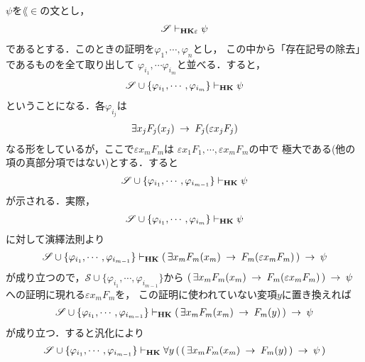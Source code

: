 	\begin{sketch}
		$\psi$を$\lang{\in}$の文とし，
		\begin{align}
			\mathscr{S} \vdash_{{\scriptsize \mbox{{\bf HK$\varepsilon$}}}} \psi
		\end{align}
		であるとする．このときの証明を$\varphi_{1},\cdots,\varphi_{n}$とし，
		この中から「存在記号の除去」であるものを全て取り出して
		$\varphi_{i_{1}},\cdots\varphi_{i_{m}}$と並べる．すると，
		\begin{align}
			\mathscr{S} \cup \{\varphi_{i_{1}},\cdots,\varphi_{i_{m}}\} 
			\vdash_{{\scriptsize \mbox{{\bf HK}}}} \psi
		\end{align}
		ということになる．各$\varphi_{i_{j}}$は
		\begin{align}
			\exists x_{j} F_{j}(x_{j}) \hspace{0.25em}\rightarrow\hspace{0.25em} F_{j}(\varepsilon x_{j} F_{j})
		\end{align}
		なる形をしているが，ここで$\varepsilon x_{m} F_{m}$は
		$\varepsilon x_{1} F_{1},\cdots,\varepsilon x_{m} F_{m}$の中で
		極大である(他の項の真部分項ではない)とする．すると
		\begin{align}
			\mathscr{S} \cup \{\varphi_{i_{1}},\cdots,\varphi_{i_{m-1}}\} 
			\vdash_{{\scriptsize \mbox{{\bf HK}}}} \psi
		\end{align}
		が示される．実際，
		\begin{align}
			\mathscr{S} \cup \{\varphi_{i_{1}},\cdots,\varphi_{i_{m}}\} 
			\vdash_{{\scriptsize \mbox{{\bf HK}}}} \psi
		\end{align}
		に対して演繹法則より
		\begin{align}
			\mathscr{S} \cup \{\varphi_{i_{1}},\cdots,\varphi_{i_{m-1}}\} 
			\vdash_{{\scriptsize \mbox{{\bf HK}}}} 
			(\, \exists x_{m} F_{m}(x_{m}) \hspace{0.25em}\rightarrow\hspace{0.25em} F_{m}(\varepsilon x_{m} F_{m})\, ) \hspace{0.25em}\rightarrow\hspace{0.25em} \psi
		\end{align}
		が成り立つので，$\mathscr{S} \cup \{\varphi_{i_{1}},\cdots,\varphi_{i_{m-1}}\}$から
		$(\, \exists x_{m} F_{m}(x_{m}) \hspace{0.25em}\rightarrow\hspace{0.25em} F_{m}(\varepsilon x_{m} F_{m})\, ) \hspace{0.25em}\rightarrow\hspace{0.25em} \psi$
		への証明に現れる$\varepsilon x_{m} F_{m}$を，
		この証明に使われていない変項$y$に置き換えれば
		\begin{align}
			\mathscr{S} \cup \{\varphi_{i_{1}},\cdots,\varphi_{i_{m-1}}\} 
			\vdash_{{\scriptsize \mbox{{\bf HK}}}} 
			(\, \exists x_{m} F_{m}(x_{m}) \hspace{0.25em}\rightarrow\hspace{0.25em} F_{m}(y)\, ) \hspace{0.25em}\rightarrow\hspace{0.25em} \psi
		\end{align}
		が成り立つ．すると汎化により
		\begin{align}
			\mathscr{S} \cup \{\varphi_{i_{1}},\cdots,\varphi_{i_{m-1}}\} 
			\provable{\mbox{{\bf HK}}} 
			\forall y\, (\, (\, \exists x_{m} F_{m}(x_{m}) \rarrow F_{m}(y)\, ) \rarrow \psi\, )

\end{align}
\end{sketch}
